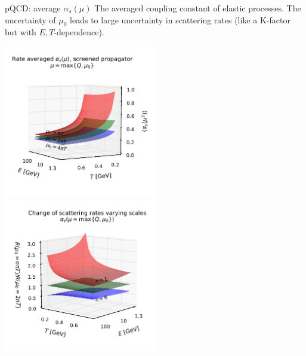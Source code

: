 \documentclass[11pt]{beamer}
\begin{document}
\begin{frame}{pQCD: average $\alpha_s(\mu)$}
The averaged coupling constant of elastic processes. The uncertainty of $\mu_0$ leads to large uncertainty in scattering rates (like a K-factor but with $E, T$-dependence).
\begin{center}
\includegraphics[width=0.5\textwidth]{fig/charm-plot/avg_alphas.pdf}
\includegraphics[width=0.5\textwidth]{fig/charm-plot/Rscale.pdf}
\end{center}
\end{frame}
\end{document}
